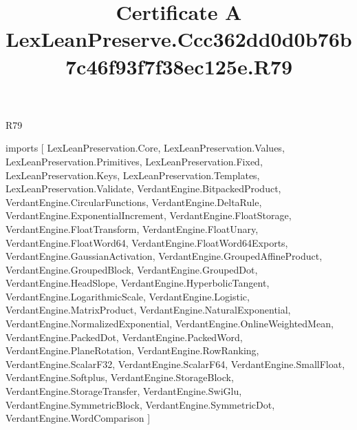 \begin{lexlean}{R79}
\title{Certificate A LexLeanPreserve.Ccc362dd0d0b76b7c46f93f7f38ec125e.R79}
\begin{coremodule}
imports [
  LexLeanPreservation.Core,
  LexLeanPreservation.Values,
  LexLeanPreservation.Primitives,
  LexLeanPreservation.Fixed,
  LexLeanPreservation.Keys,
  LexLeanPreservation.Templates,
  LexLeanPreservation.Validate,
  VerdantEngine.BitpackedProduct,
  VerdantEngine.CircularFunctions,
  VerdantEngine.DeltaRule,
  VerdantEngine.ExponentialIncrement,
  VerdantEngine.FloatStorage,
  VerdantEngine.FloatTransform,
  VerdantEngine.FloatUnary,
  VerdantEngine.FloatWord64,
  VerdantEngine.FloatWord64Exports,
  VerdantEngine.GaussianActivation,
  VerdantEngine.GroupedAffineProduct,
  VerdantEngine.GroupedBlock,
  VerdantEngine.GroupedDot,
  VerdantEngine.HeadSlope,
  VerdantEngine.HyperbolicTangent,
  VerdantEngine.LogarithmicScale,
  VerdantEngine.Logistic,
  VerdantEngine.MatrixProduct,
  VerdantEngine.NaturalExponential,
  VerdantEngine.NormalizedExponential,
  VerdantEngine.OnlineWeightedMean,
  VerdantEngine.PackedDot,
  VerdantEngine.PackedWord,
  VerdantEngine.PlaneRotation,
  VerdantEngine.RowRanking,
  VerdantEngine.ScalarF32,
  VerdantEngine.ScalarF64,
  VerdantEngine.SmallFloat,
  VerdantEngine.Softplus,
  VerdantEngine.StorageBlock,
  VerdantEngine.StorageTransfer,
  VerdantEngine.SwiGlu,
  VerdantEngine.SymmetricBlock,
  VerdantEngine.SymmetricDot,
  VerdantEngine.WordComparison
]


\end{coremodule}
\end{lexlean}
